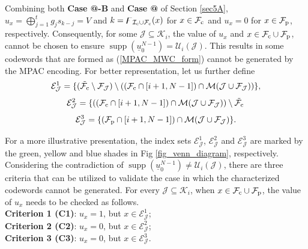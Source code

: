 \documentclass[12pt, draftclsnofoot, peerreview, onecolumn]{IEEEtran}
\makeatletter
\theoremstyle{noparent}
\newcommand{\Rmnum}[1]{\expandafter\@slowromancap\romannumeral #1@}
\DeclareMathOperator\supp{supp}
\makeatother
\begin{document}
Combining both \textbf{Case \Rmnum{1}-B} and \textbf{Case \Rmnum{3}} of Section \ref{sec5A},
$u_x=\bigoplus_{j=1}^{t} g_{j} s_{k-j}=V$ and
$k=\digamma_{\mathcal{I}_{\rm c} \cup \mathcal{F}_{\rm c}}(x)$ for $x\in \mathcal{F}_{\rm c}$ 
and $u_x=0$ for $x\in \mathcal{F}_{\rm p}$, respectively.
Consequently, for some $\mathcal{J}\subseteq\mathcal{K}_i$,
the value of $u_x$ and $x\in \mathcal{F}_{\rm c}\cup \mathcal{F}_{\rm p}$, cannot be chosen to ensure
$\supp({\underline{u}_0^{N-1}})=\mathcal{U}_i(\mathcal{J})$.
This results in some codewords that are formed as (\ref{MPAC_MWC_form}) 
cannot be generated by the MPAC encoding.
For better representation, let us further define
$$\mathcal{E}_{\mathcal{J}}^{1}=\{(\tilde{\mathcal{F}_{\rm c}}\setminus\mathcal{F}_{\mathcal{J}}) \setminus 
((\mathcal{F}_{\rm c}\cap[i+1,N-1])\cap\mathcal{M}(\mathcal{J} \cup \mathcal{F}_\mathcal{J}))\},$$
$$ \mathcal{E}_{\mathcal{J}}^{2}=\{((\mathcal{F}_{\rm c}\cap[i+1,N-1])\cap\mathcal{M}(\mathcal{J} \cup \mathcal{F}_\mathcal{J})) 
\setminus \tilde{\mathcal{F}_{\rm c}}\, $$
$$\mathcal{E}_{\mathcal{J}}^{3}=\{(\mathcal{F}_{\rm p}\cap[i+1,N-1])\cap\mathcal{M}(\mathcal{J} \cup \mathcal{F}_\mathcal{J})\}.$$ 

For a more illustrative presentation, the index sets 
$\mathcal{E}_{\mathcal{J}}^{1}$, $\mathcal{E}_{\mathcal{J}}^{2}$ and $\mathcal{E}_{\mathcal{J}}^{3}$ are 
marked by the green, yellow and blue shades
in Fig \ref{fig_venn_diagram}, respectively.
Considering the contradiction of $\supp({\underline{u}_0^{N-1}})\neq \mathcal{U}_i(\mathcal{J})$,
there are three criteria that can be utilized to validate the case
in which the characterized codewords cannot be generated.
For every $\mathcal{J}\subseteq\mathcal{K}_i$, when $x\in \mathcal{F}_{\rm c}\cup \mathcal{F}_{\rm p}$, the value of $u_x$ 
needs to be checked as follows.\\
\indent\textbf{Criterion 1 (C1)}: $u_x=1$, but $x\in \mathcal{E}_{\mathcal{J}}^{1}$;\\
\indent\textbf{Criterion 2 (C2)}: $u_x=0$, but $x\in \mathcal{E}_{\mathcal{J}}^{2}$;\\
\indent\textbf{Criterion 3 (C3)}: $u_x=0$, but $x\in \mathcal{E}_{\mathcal{J}}^{3}$.
\end{document}

